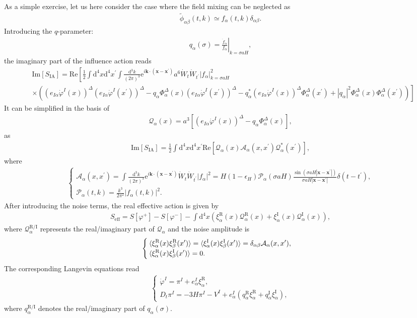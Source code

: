 \documentclass[aps, prd
, preprint
, nofootinbib 
]{revtex4-1}
\newcommand{\dd}{\mathrm{d}}
\newcommand{\ee}{\mathrm{e}}
\newcommand{\calP}{\mathcal{P}}
\renewcommand{\Re}{\mathrm{Re}}
\renewcommand{\Im}{\mathrm{Im}}
\newcommand{\dk}{\frac{\dd^3k}{(2\pi)^3}}
\newcommand{\bae}[1]{\begin{align} #1 \end{align}}
\newcommand{\bce}[1]{\begin{cases} #1 \end{cases}}
\begin{document}
As a simple exercise, let us here consider the case where the field mixing can be neglected as
\bae{
	\tilde{\phi}_{\alpha\beta}(t,k)\simeq f_\alpha(t,k)\delta_{\alpha\beta}.
}
Introducing the $q$-parameter:
\bae{
	q_\alpha(\sigma)=\left.\frac{\dot{f}_\alpha}{f_\alpha}\right|_{k=\sigma aH},
}
the imaginary part of the influence action reads
\bae{
	&\Im[S_\text{IA}]=\Re\left[\frac{1}{2}\int\dd^4x\dd^4x^\prime\int\dk\ee^{i\mathbf{k}\cdot(\mathbf{x}-\mathbf{x}^\prime)}a^6\dot{W}_t\dot{W}_{t^\prime}
	|f_\alpha|^2_{k=\sigma aH} \right. \nonumber \\
	&\left.\times\left(\left(e_{I\alpha}\dot{\varphi}^I(x)\right)^\Delta\left(e_{I\alpha}\dot{\varphi}^I(x^\prime)\right)^\Delta
	-q_\alpha\Phi^\Delta_\alpha(x)\left(e_{I\alpha}\dot{\varphi}^I(x^\prime)\right)^\Delta
	-q_\alpha^*\left(e_{I\alpha}\dot{\varphi}^I(x)\right)^\Delta\Phi_\alpha^\Delta(x^\prime)
	+|q_\alpha|^2\Phi_\alpha^\Delta(x)\Phi_\alpha^\Delta(x^\prime)\right)\right]
}
It can be simplified in the basis of
\bae{
	\mathcal{Q}_\alpha(x)=a^3\left[\left(e_{I\alpha}\dot{\varphi}^I(x)\right)^\Delta-q_\alpha\Phi_\alpha^\Delta(x)\right],
}
as
\bae{
	\Im[S_\text{IA}]=\frac{1}{2}\int\dd^4x\dd^4x^\prime\Re[\mathcal{Q}_\alpha(x)\mathcal{A}_\alpha(x,x^\prime)\mathcal{Q}^*_\alpha(x^\prime)],
}
where
\bae{\label{eq: A and P}
	\bce{
		\displaystyle
		\mathcal{A}_\alpha(x,x^\prime)=\int\dk\ee^{i\mathbf{k}\cdot(\mathbf{x}-\mathbf{x}^\prime)}\dot{W}_t\dot{W}_{t^\prime}|f_\alpha|^2
		=H(1-\epsilon_H)\calP_\alpha(\sigma aH)\frac{\sin(\sigma aH|\mathbf{x}-\mathbf{x}^\prime|)}{\sigma aH|\mathbf{x}-\mathbf{x}^\prime|}
		\delta(t-t^\prime), \\[10pt]
		\displaystyle
		\calP_\alpha(t,k)=\frac{k^3}{2\pi^2}|f_\alpha(t,k)|^2.
	}
}
After introducing the noise terms, the real effective action is given by
\bae{
	S_\text{eff}=S[\varphi^+]-S[\varphi^-]-\int\dd^4x\left(\xi^\text{R}_\alpha(x)\mathcal{Q}^\text{R}_\alpha(x)
	+\xi^\text{I}_\alpha(x)\mathcal{Q}^\text{I}_\alpha(x)\right),
}
where $\mathcal{Q}^{\text{R}/\text{I}}_\alpha$ represents the real/imaginary part of $\mathcal{Q}_\alpha$ and
the noise amplitude is
\bae{
	\bce{
		\displaystyle
		\braket{\xi^\text{R}_\alpha(x)\xi^\text{R}_\beta(x^\prime)}=\braket{\xi^\text{I}_\alpha(x)\xi^\text{I}_\beta(x^\prime)}
		=\delta_{\alpha\beta}\mathcal{A}_\alpha(x,x^\prime), \\
		\displaystyle
		\braket{\xi^\text{R}_\alpha(x)\xi^\text{I}_\beta(x^\prime)}=0.
	}
}
The corresponding Langevin equations read
\bae{
	\bce{
		\displaystyle
		\dot{\varphi}^I=\pi^I+e^I_\alpha\xi_\alpha^\text{R}, \\
		\displaystyle
		D_t\pi^I=-3H\pi^I-V^I+e^I_\alpha(q_\alpha^\text{R}\xi^\text{R}_\alpha+q_\alpha^\text{I}\xi^\text{I}_\alpha),
	}
}
where $q_\alpha^{\text{R}/\text{I}}$ denotes the real/imaginary part of $q_\alpha(\sigma)$.
\end{document}
